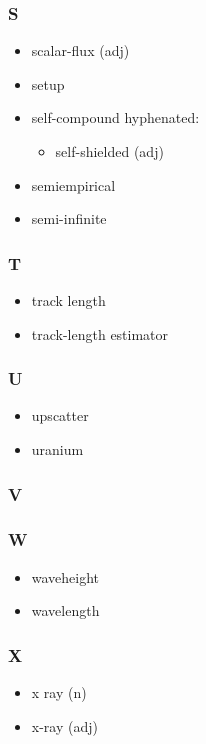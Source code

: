 \documentclass[10pt, letter]{article}
\begin{document}
\begin{multicols}{2}
\subsubsection*{S}
\begin{itemize}
\item scalar-flux (adj)
\item setup
\item self-compound hyphenated:
  \begin{itemize}
  \item self-shielded (adj)
  \end{itemize}
\item semiempirical
\item semi-infinite
\end{itemize}

\subsubsection*{T}
\begin{itemize}
\item track length
\item track-length estimator
\end{itemize}
\subsubsection*{U}
\begin{itemize}
\item upscatter
\item uranium
\end{itemize}
\subsubsection*{V}
\subsubsection*{W}
\begin{itemize}
\item waveheight
\item wavelength
\end{itemize}

\subsubsection*{X}
\begin{itemize}
\item x ray (n) 
\item x-ray (adj)
\end{itemize}

\end{multicols}
\end{document}
